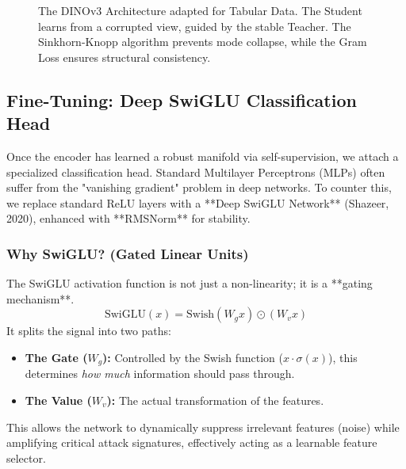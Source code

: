 \documentclass[
  10pt,
  twocolumn,
  a4paper,
  parskip=half
]{scrartcl}
\begin{document}
\begin{figure}[H]
{
        }
        \caption{The DINOv3 Architecture adapted for Tabular Data. The Student learns from a corrupted view, guided by the stable Teacher. The Sinkhorn-Knopp algorithm prevents mode collapse, while the Gram Loss ensures structural consistency.}
        \label{fig:dino_architecture}
    \end{figure}

    \subsection{Fine-Tuning: Deep SwiGLU Classification Head}
    Once the encoder has learned a robust manifold via self-supervision, we attach a specialized classification head. Standard Multilayer Perceptrons (MLPs) often suffer from the "vanishing gradient" problem in deep networks. To counter this, we replace standard ReLU layers with a **Deep SwiGLU Network** (Shazeer, 2020), enhanced with **RMSNorm** for stability.

    \subsubsection{Why SwiGLU? (Gated Linear Units)}
    The SwiGLU activation function is not just a non-linearity; it is a **gating mechanism**.
    \begin{equation}
        \text{SwiGLU}(x) = \text{Swish}(W_g x) \odot (W_v x)
    \end{equation}
    It splits the signal into two paths:
    \begin{itemize}
        \item \textbf{The Gate ($W_g$):} Controlled by the Swish function ($x \cdot \sigma(x)$), this determines \textit{how much} information should pass through.
        \item \textbf{The Value ($W_v$):} The actual transformation of the features.
    \end{itemize}
    This allows the network to dynamically suppress irrelevant features (noise) while amplifying critical attack signatures, effectively acting as a learnable feature selector.
\end{document}
